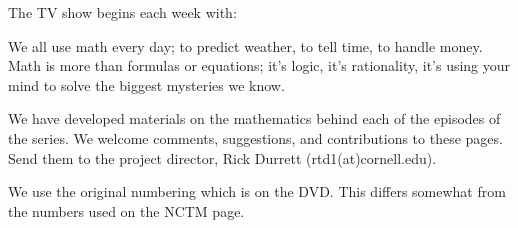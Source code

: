 


The TV show  begins each week with:

We all use math every day; 
to predict weather, to tell time, to handle money. 
Math is more than formulas or equations; 
it's logic, it's rationality, 
it's using your mind to solve the biggest mysteries we know. 

We have developed materials on the mathematics behind each of the episodes of the series. We welcome comments, suggestions, and contributions to these pages. Send them to the project director, Rick Durrett (rtd1(at)cornell.edu).

We use the original numbering which is on the DVD. This differs somewhat from the numbers used on the NCTM page.






































